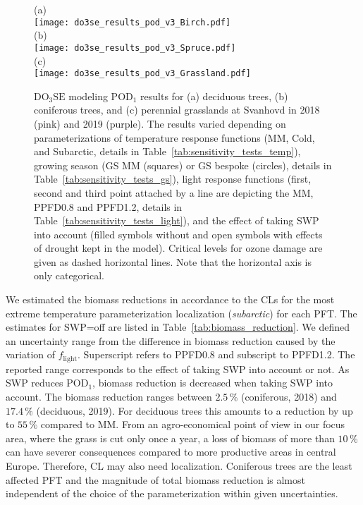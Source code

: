 \documentclass[bg, manuscript]{copernicus}
\begin{document}
\begin{figure}[t]
  \centering
  (a)\\
  \texttt{[image: do3se\_results\_pod\_v3\_Birch.pdf]}\\
  (b)\\
  \texttt{[image: do3se\_results\_pod\_v3\_Spruce.pdf]}\\
  (c)\\
  \texttt{[image: do3se\_results\_pod\_v3\_Grassland.pdf]}
  \caption{$\mathrm{DO_3SE}$ modeling $\mathrm{POD_1}$ results for (a) deciduous trees, (b) coniferous trees, and (c) perennial grasslands at Svanhovd in 2018 (pink) and 2019 (purple). The results varied depending on parameterizations of temperature response functions (MM, Cold, and Subarctic, details in Table~\ref{tab:sensitivity_tests_temp}), growing season (GS MM (squares) or GS bespoke (circles), details in Table~\ref{tab:sensitivity_tests_gs}), light response functions (first, second and third point attached by a line are depicting the MM, PPFD0.8 and PPFD1.2, details in Table~\ref{tab:sensitivity_tests_light}), and the effect of taking SWP into account (filled symbols without and open symbols with effects of drought kept in the model). Critical levels for ozone damage \citep{ICP:MappingManual2017,ESPR:Hayes2021} are given as dashed horizontal lines. Note that the horizontal axis is only categorical.}
  \label{fig:pody_rel}
\end{figure}

We estimated the biomass reductions in accordance to the CLs \citep{ICP:MappingManual2017, ESPR:Hayes2021} for the most extreme temperature parameterization localization (\emph{subarctic}) for each PFT. The estimates for SWP=off are listed in Table~\ref{tab:biomass_reduction}. We defined an uncertainty range from the difference in biomass reduction caused by the variation of $f_\mathrm{light}$. Superscript refers to PPFD0.8 and subscript to PPFD1.2. The reported range corresponds to the effect of taking SWP into account or not. As SWP reduces $\mathrm{POD_1}$, biomass reduction is decreased when taking SWP into account. The biomass reduction ranges between $2.5\,\unit{\%}$ (coniferous, 2018) and $17.4\,\unit{\%}$ (deciduous, 2019). For deciduous trees this amounts to a reduction by up to $55\,\unit{\%}$ compared to MM. From an agro-economical point of view in our focus area, where the grass is cut only once a year, a loss of biomass of more than $10\,\unit{\%}$ can have severer consequences compared to more productive areas in central Europe. Therefore, CL may also need localization.
Coniferous trees are the least affected PFT and the magnitude of total biomass reduction is almost independent of the choice of the parameterization within given uncertainties.
\end{document}
